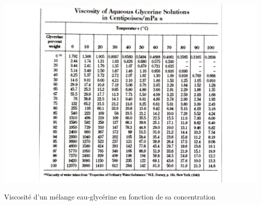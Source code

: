\begin{table}[H]
    \centering
    \includegraphics[scale=0.5]{graph/table-viscu}
    \caption{Viscosité d'un mélange eau-glycérine en fonction de sa concentration}
    \label{tab:table-viscu}
\end{table}